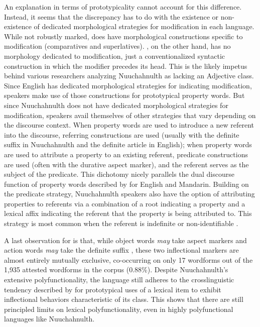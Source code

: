An explanation in terms of prototypicality cannot account for this difference. Instead, it seems that the discrepancy has to do with the existence or non-existence of dedicated morphological strategies for modification in each language. While not robustly marked,  does have morphological constructions specific to modification (comparatives and superlatives). , on the other hand, has no morphology dedicated to modification, just a conventionalized syntactic construction in which the modifier precedes its head. This is the likely impetus behind various researchers analyzing Nuuchahnulth as lacking an Adjective class. Since English has dedicated morphological strategies for indicating modification, speakers make use of those constructions for prototypical property words. But since Nuuchahnulth does not have dedicated morphological strategies for modification, speakers avail themselves of other strategies that vary depending on the discourse context. When property words are used to introduce a new referent into the discourse, referring constructions are used (usually with the definite suffix  in Nuuchahnulth and the definite article in English); when property words are used to attribute a property to an existing referent, predicate constructions are used (often with the durative aspect marker), and the referent serves as the subject of the predicate. This dichotomy nicely parallels the dual discourse function of property words described by \textcite{Thompson1989} for English and Mandarin. Building on the predicate strategy, Nuuchahnulth speakers also have the option of attributing properties to referents via a combination of a root indicating a property and a lexical affix indicating the referent that the property is being attributed to. This strategy is most common when the referent is indefinite or non-identifiable \parencite[144]{Nakayama2001}.

A last observation for  is that, while object words \emph{may} take aspect markers and action words \emph{may} take the definite suffix , these two inflectional markers are almost entirely mutually exclusive, co-occurring on only 17 wordforms out of the 1,935 attested wordforms in the corpus (0.88\%). Despite Nuuchahnulth's extensive polyfunctionality, the language still adheres to the crosslinguistic tendency described by \textcite{HopperThompson1984} for prototypical uses of a lexical item to exhibit inflectional behaviors characteristic of its class. This shows that there are still principled limits on lexical polyfunctionality, even in highly polyfunctional languages like Nuuchahnulth.

